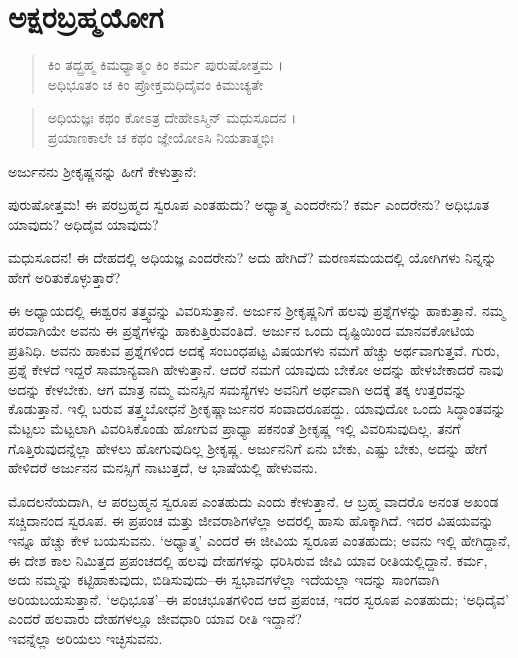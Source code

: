 
\chapter{ಅಕ್ಷರಬ್ರಹ್ಮಯೋಗ}

\begin{verse}
ಕಿಂ ತದ್ಬ್ರಹ್ಮ ಕಿಮಧ್ಯಾತ್ಮಂ ಕಿಂ ಕರ್ಮ ಪುರುಷೋತ್ತಮ ।\\ಅಧಿಭೂತಂ ಚ ಕಿಂ ಪ್ರೋಕ್ತಮಧಿದೈವಂ ಕಿಮುಚ್ಯತೇ 
\end{verse}

\begin{verse}
ಅಧಿಯಜ್ಞಃ ಕಥಂ ಕೋಽತ್ರ ದೇಹೇಽಸ್ಮಿನ್ ಮಧುಸೂದನ ।\\ಪ್ರಯಾಣಕಾಲೇ ಚ ಕಥಂ ಜ್ಞೇಯೋಽಸಿ ನಿಯತಾತ್ಮಭಿಃ 
\end{verse}

ಅರ್ಜುನನು ಶ್ರೀಕೃಷ್ಣನನ್ನು ಹೀಗೆ ಕೇಳುತ್ತಾನೆ:

{\small ಪುರುಷೋತ್ತಮ! ಈ ಪರಬ್ರಹ್ಮದ ಸ್ವರೂಪ ಎಂತಹುದು? ಅಧ್ಯಾತ್ಮ ಎಂದರೇನು? ಕರ್ಮ ಎಂದರೇನು? ಅಧಿಭೂತ ಯಾವುದು? ಅಧಿದೈವ ಯಾವುದು?}

{\small ಮಧುಸೂದನ! ಈ ದೇಹದಲ್ಲಿ ಅಧಿಯಜ್ಞ ಎಂದರೇನು? ಅದು ಹೇಗಿದೆ? ಮರಣಸಮಯದಲ್ಲಿ ಯೋಗಿಗಳು ನಿನ್ನನ್ನು ಹೇಗೆ ಅರಿತುಕೊಳ್ಳುತ್ತಾರೆ?}

ಈ ಅಧ್ಯಾಯದಲ್ಲಿ ಈಶ್ವರನ ತತ್ತ್ವವನ್ನು ವಿವರಿಸುತ್ತಾನೆ. ಅರ್ಜುನ ಶ್ರೀಕೃಷ್ಣನಿಗೆ ಹಲವು ಪ್ರಶ್ನೆಗಳನ್ನು ಹಾಕುತ್ತಾನೆ. ನಮ್ಮ ಪರವಾಗಿಯೇ ಅವನು ಈ ಪ್ರಶ್ನೆಗಳನ್ನು ಹಾಕುತ್ತಿರುವಂತಿದೆ. ಅರ್ಜುನ ಒಂದು ದೃಷ್ಟಿಯಿಂದ ಮಾನವಕೋಟಿಯ ಪ್ರತಿನಿಧಿ. ಅವನು ಹಾಕುವ ಪ್ರಶ್ನೆಗಳಿಂದ ಅದಕ್ಕೆ ಸಂಬಂಧಪಟ್ಟ ವಿಷಯಗಳು ನಮಗೆ ಹೆಚ್ಚು ಅರ್ಥವಾಗುತ್ತವೆ. ಗುರು, ಪ್ರಶ್ನೆ ಕೇಳದೆ ಇದ್ದರೆ ಸಾಮಾನ್ಯವಾಗಿ ಹೇಳುತ್ತಾನೆ. ಆದರೆ ನಮಗೆ ಯಾವುದು ಬೇಕೋ ಅದನ್ನು ಹೇಳಬೇಕಾದರೆ ನಾವು ಅದನ್ನು ಕೇಳಬೇಕು. ಆಗ ಮಾತ್ರ ನಮ್ಮ ಮನಸ್ಸಿನ ಸಮಸ್ಯೆಗಳು ಅವನಿಗೆ ಅರ್ಥವಾಗಿ ಅದಕ್ಕೆ ತಕ್ಕ ಉತ್ತರವನ್ನು ಕೊಡುತ್ತಾನೆ. ಇಲ್ಲಿ ಬರುವ ತತ್ತ್ವಬೋಧನೆ ಶ್ರೀಕೃಷ್ಣಾರ್ಜುನರ ಸಂವಾದರೂಪದ್ದು. ಯಾವುದೋ ಒಂದು ಸಿದ್ಧಾಂತವನ್ನು ಮೆಟ್ಟಲು ಮೆಟ್ಟಲಾಗಿ ವಿವರಿಸಿಕೊಂಡು ಹೋಗುವ ಪ್ರಾಧ್ಯಾ ಪಕನಂತೆ ಶ್ರೀಕೃಷ್ಣ ಇಲ್ಲಿ ವಿವರಿಸುವುದಿಲ್ಲ. ತನಗೆ ಗೊತ್ತಿರುವುದನ್ನೆಲ್ಲಾ ಹೇಳಲು ಹೋಗುವುದಿಲ್ಲ ಶ್ರೀಕೃಷ್ಣ. ಅರ್ಜುನನಿಗೆ ಏನು ಬೇಕು, ಎಷ್ಟು ಬೇಕು, ಅದನ್ನು ಹೇಗೆ ಹೇಳಿದರೆ ಅರ್ಜುನನ ಮನಸ್ಸಿಗೆ ನಾಟುತ್ತದೆ, ಆ ಭಾಷೆಯಲ್ಲಿ ಹೇಳುವನು.

ಮೊದಲನೆಯದಾಗಿ, ಆ ಪರಬ್ರಹ್ಮನ ಸ್ವರೂಪ ಎಂತಹುದು ಎಂದು ಕೇಳುತ್ತಾನೆ. ಆ ಬ್ರಹ್ಮ ವಾದರೊ ಅನಂತ ಅಖಂಡ ಸಚ್ಚಿದಾನಂದ ಸ್ವರೂಪ. ಈ ಪ್ರಪಂಚ ಮತ್ತು ಜೀವರಾಶಿಗಳೆಲ್ಲಾ ಅದರಲ್ಲಿ ಹಾಸು ಹೊಕ್ಕಾಗಿದೆ. ಇದರ ವಿಷಯವನ್ನು ಇನ್ನೂ ಹೆಚ್ಚು ಕೇಳ ಬಯಸುವನು. ‘ಅಧ್ಯಾತ್ಮ’ ಎಂದರೆ ಈ ಜೀವಿಯ ಸ್ವರೂಪ ಎಂತಹುದು; ಅವನು ಇಲ್ಲಿ ಹೇಗಿದ್ದಾನೆ, ಈ ದೇಶ ಕಾಲ ನಿಮಿತ್ತದ ಪ್ರಪಂಚದಲ್ಲಿ ಹಲವು ದೇಹಗಳನ್ನು ಧರಿಸಿರುವ ಜೀವಿ ಯಾವ ರೀತಿಯಲ್ಲಿದ್ದಾನೆ. ಕರ್ಮ, ಅದು ನಮ್ಮನ್ನು ಕಟ್ಟಿಹಾಕುವುದು, ಬಿಡಿಸುವುದು–ಈ ಸ್ವಭಾವಗಳೆಲ್ಲಾ ಇದೆಯಲ್ಲಾ ಇದನ್ನು ಸಾಂಗವಾಗಿ ಅರಿಯಬಯಸುತ್ತಾನೆ. ‘ಅಧಿಭೂತ’–ಈ ಪಂಚಭೂತಗಳಿಂದ ಆದ ಪ್ರಪಂಚ, ಇದರ ಸ್ವರೂಪ ಎಂತಹುದು; ‘ಅಧಿದೈವ’ ಎಂದರೆ ಹಲವಾರು ದೇಹಗಳಲ್ಲೂ ಜೀವಧಾರಿ ಯಾವ ರೀತಿ ಇದ್ದಾನೆ?\\ಇವನ್ನೆಲ್ಲಾ ಅರಿಯಲು ಇಚ್ಛಿಸುವನು.

